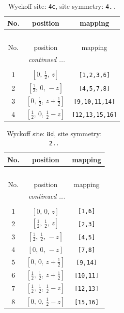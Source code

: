 \documentclass[fleqn,8pt]{jsarticle}
\begin{document}
\renewcommand{\arraystretch}{1.2}
\begin{longtable}{ccc}
\caption{Wyckoff site: {\tt 4c}, site symmetry: {\tt 4..}}
 \\
 \hline \hline
No. & position & mapping \\ \hline \endfirsthead

\multicolumn{2}{l}{\tablename\ \thetable{}} \\
 \hline \hline
No. & position & mapping \\ \hline \endhead

 \hline \hline
\multicolumn{2}{r}{\footnotesize\it continued ...} \\ \endfoot

 \hline \hline
\multicolumn{2}{r}{} \\ \endlastfoot

1 & $\left[ 0,\, \frac{1}{2},\, z \right]$ & {\tt [1,2,3,6]} \\ \hline
2 & $\left[ \frac{1}{2},\, 0,\, - z \right]$ & {\tt [4,5,7,8]} \\ \hline
3 & $\left[ 0,\, \frac{1}{2},\, z + \frac{1}{2} \right]$ & {\tt [9,10,11,14]} \\ \hline
4 & $\left[ \frac{1}{2},\, 0,\, \frac{1}{2} - z \right]$ & {\tt [12,13,15,16]} \\
\end{longtable}
\renewcommand{\arraystretch}{1.2}
\begin{longtable}{ccc}
\caption{Wyckoff site: {\tt 8d}, site symmetry: {\tt 2..}}
 \\
 \hline \hline
No. & position & mapping \\ \hline \endfirsthead

\multicolumn{2}{l}{\tablename\ \thetable{}} \\
 \hline \hline
No. & position & mapping \\ \hline \endhead

 \hline \hline
\multicolumn{2}{r}{\footnotesize\it continued ...} \\ \endfoot

 \hline \hline
\multicolumn{2}{r}{} \\ \endlastfoot

1 & $\left[ 0,\, 0,\, z \right]$ & {\tt [1,6]} \\ \hline
2 & $\left[ \frac{1}{2},\, \frac{1}{2},\, z \right]$ & {\tt [2,3]} \\ \hline
3 & $\left[ \frac{1}{2},\, \frac{1}{2},\, - z \right]$ & {\tt [4,5]} \\ \hline
4 & $\left[ 0,\, 0,\, - z \right]$ & {\tt [7,8]} \\ \hline
5 & $\left[ 0,\, 0,\, z + \frac{1}{2} \right]$ & {\tt [9,14]} \\ \hline
6 & $\left[ \frac{1}{2},\, \frac{1}{2},\, z + \frac{1}{2} \right]$ & {\tt [10,11]} \\ \hline
7 & $\left[ \frac{1}{2},\, \frac{1}{2},\, \frac{1}{2} - z \right]$ & {\tt [12,13]} \\ \hline
8 & $\left[ 0,\, 0,\, \frac{1}{2} - z \right]$ & {\tt [15,16]} \\
\end{longtable}
\end{document}
